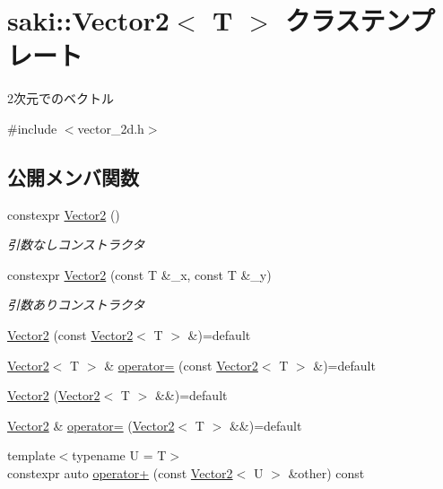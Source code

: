 \hypertarget{classsaki_1_1_vector2}{}\section{saki\+:\+:Vector2$<$ T $>$ クラステンプレート}
\label{classsaki_1_1_vector2}


2次元でのベクトル  




{\ttfamily \#include $<$vector\+\_\+2d.\+h$>$}

\subsection*{公開メンバ関数}
\begin{DoxyCompactItemize}
\item 
constexpr \mbox{\hyperlink{classsaki_1_1_vector2_af57b72f4255812a361bef1922a226f86}{Vector2}} ()
\begin{DoxyCompactList}\small\item\em 引数なしコンストラクタ \end{DoxyCompactList}\item 
constexpr \mbox{\hyperlink{classsaki_1_1_vector2_ad0f3d0a05370f1ef4947520245f6e9a8}{Vector2}} (const T \&\+\_\+x, const T \&\+\_\+y)
\begin{DoxyCompactList}\small\item\em 引数ありコンストラクタ \end{DoxyCompactList}\item 
\mbox{\hyperlink{classsaki_1_1_vector2_af3d61bb90047a8621cba0a17b265bfaa}{Vector2}} (const \mbox{\hyperlink{classsaki_1_1_vector2}{Vector2}}$<$ T $>$ \&)=default
\item 
\mbox{\hyperlink{classsaki_1_1_vector2}{Vector2}}$<$ T $>$ \& \mbox{\hyperlink{classsaki_1_1_vector2_ae6ee2a6387bfe58bdd5bf74d388370a9}{operator=}} (const \mbox{\hyperlink{classsaki_1_1_vector2}{Vector2}}$<$ T $>$ \&)=default
\item 
\mbox{\hyperlink{classsaki_1_1_vector2_abb8b6443d50d1008bf95569019414234}{Vector2}} (\mbox{\hyperlink{classsaki_1_1_vector2}{Vector2}}$<$ T $>$ \&\&)=default
\item 
\mbox{\hyperlink{classsaki_1_1_vector2}{Vector2}} \& \mbox{\hyperlink{classsaki_1_1_vector2_a56cf093f36e7949a9c56df42a9660f38}{operator=}} (\mbox{\hyperlink{classsaki_1_1_vector2}{Vector2}}$<$ T $>$ \&\&)=default
\item 
{\footnotesize template$<$typename U  = T$>$ }\\constexpr auto \mbox{\hyperlink{classsaki_1_1_vector2_a858afb6fe807d543ca5b266404226cd5}{operator+}} (const \mbox{\hyperlink{classsaki_1_1_vector2}{Vector2}}$<$ U $>$ \&other) const

\end{DoxyCompactItemize}
